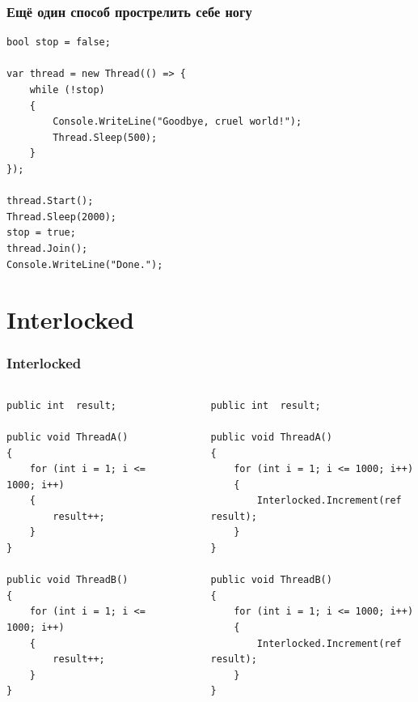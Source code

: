 \documentclass[xetex,mathserif,serif]{beamer}
\begin{document}
	\begin{frame}[fragile]
		\frametitle{Ещё один способ прострелить себе ногу}
		\begin{verbatim}
bool stop = false;

var thread = new Thread(() => {
    while (!stop)
    {
        Console.WriteLine("Goodbye, cruel world!");
        Thread.Sleep(500);
    }
});

thread.Start();
Thread.Sleep(2000);
stop = true;
thread.Join();
Console.WriteLine("Done.");
		\end{verbatim}
	\end{frame}

	\section{Interlocked}

	\begin{frame}[fragile]
		\frametitle{Interlocked}
		\begin{small}
			\begin{columns}
				\begin{column}{0.4\textwidth}
					\begin{verbatim}
public int  result;

public void ThreadA()
{
    for (int i = 1; i <= 1000; i++) 
    {
        result++;
    }
}

public void ThreadB()
{
    for (int i = 1; i <= 1000; i++) 
    {
        result++; 
    }
}
					\end{verbatim}
				\end{column}
				\begin{column}{0.05\textwidth}
					\rule{0.1mm}{0.8\textheight}
				\end{column}
				\begin{column}{0.5\textwidth}
					\begin{verbatim}
public int  result;

public void ThreadA()
{
    for (int i = 1; i <= 1000; i++) 
    {
        Interlocked.Increment(ref result);
    }
}

public void ThreadB()
{
    for (int i = 1; i <= 1000; i++) 
    {
        Interlocked.Increment(ref result); 
    }
}
					\end{verbatim}
				\end{column}
			\end{columns}
		\end{small}
	\end{frame}
\end{document}
